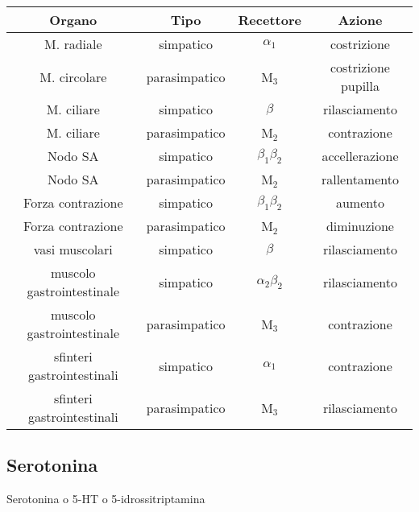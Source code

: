 \begin{tabular}{|c|c|c|c|}
\hline 
\textbf{Organo} & \textbf{Tipo} & \textbf{Recettore} & \textbf{Azione} \\ 
\hline\hline 
M. radiale & simpatico & $\alpha_1$ & costrizione \\ 
\hline 
M. circolare & parasimpatico & M${}_3$ & costrizione pupilla \\ 
\hline 
M. ciliare & simpatico & $\beta$ & rilasciamento \\ 
\hline 
M. ciliare & parasimpatico & M${}_2$ & contrazione \\ 
\hline 
Nodo SA & simpatico & $\beta_1\beta_2$ & accellerazione \\ 
\hline 
Nodo SA & parasimpatico & M${}_2$ & rallentamento \\ 
\hline 
Forza contrazione & simpatico & $\beta_1\beta_2$ & aumento \\ 
\hline 
Forza contrazione & parasimpatico & M${}_2$ & diminuzione \\ 
\hline 
vasi muscolari & simpatico & $\beta$ & rilasciamento \\ 
\hline 
muscolo gastrointestinale & simpatico & $\alpha_2\beta_2$ & rilasciamento \\ 
\hline 
muscolo gastrointestinale & parasimpatico & M${}_3$ & contrazione \\ 
\hline 
sfinteri gastrointestinali & simpatico & $\alpha_1$ & contrazione \\ 
\hline 
sfinteri gastrointestinali & parasimpatico & M${}_3$ & rilasciamento \\ 
\hline 
\end{tabular} 

\subsection{Serotonina}

Serotonina o 5-HT o 5-idrossitriptamina


